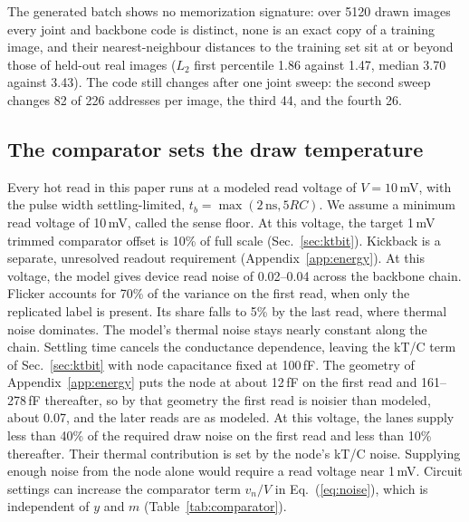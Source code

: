 \documentclass[reprint,amsmath,amssymb,aps,nofootinbib]{revtex4-2}
\begin{document}
The generated batch shows no memorization signature: over 5120 drawn
images every joint and backbone code is distinct, none is an exact
copy of a training image, and their nearest-neighbour distances to the
training set sit at or beyond those of held-out real images ($L_2$
first percentile 1.86 against 1.47, median 3.70 against 3.43).
The code still changes after one joint sweep: the second sweep changes
82 of 226 addresses per image, the third 44, and the fourth 26.

\subsection{The comparator sets the draw temperature}\label{sec:comparator}

Every hot read in this paper runs at a modeled read voltage of
$V = 10$\,mV, with the pulse width settling-limited,
$t_b = \max(2\,\mathrm{ns}, 5RC)$. We assume a minimum read voltage of 10\,mV, called the sense floor. At
this voltage, the target 1\,mV trimmed comparator offset is 10\% of full
scale (Sec.~\ref{sec:ktbit}). Kickback is a separate, unresolved
readout requirement (Appendix~\ref{app:energy}). At this voltage, the model gives device read noise of 0.02--0.04 across
the backbone chain. Flicker accounts for 70\% of the variance on the
first read, when only the replicated label is present. Its share falls
to 5\% by the last read, where thermal noise dominates. The model's thermal noise stays nearly constant along the chain.
Settling time cancels the conductance dependence, leaving the kT/C term
of Sec.~\ref{sec:ktbit} with node capacitance fixed at 100\,fF. The geometry of Appendix~\ref{app:energy} puts the node
at about 12\,fF on the first read and 161--278\,fF thereafter, so by
that geometry the first read is noisier than modeled, about 0.07, and
the later reads are as modeled. At this voltage, the lanes supply less than 40\% of the required draw
noise on the first read and less than 10\% thereafter. Their thermal
contribution is set by the node's kT/C noise. Supplying enough noise
from the node alone would require a read voltage near 1\,mV. Circuit settings can increase the comparator term $v_n / V$ in
Eq.~(\ref{eq:noise}), which is independent of $y$ and $m$
(Table~\ref{tab:comparator}).
\end{document}
